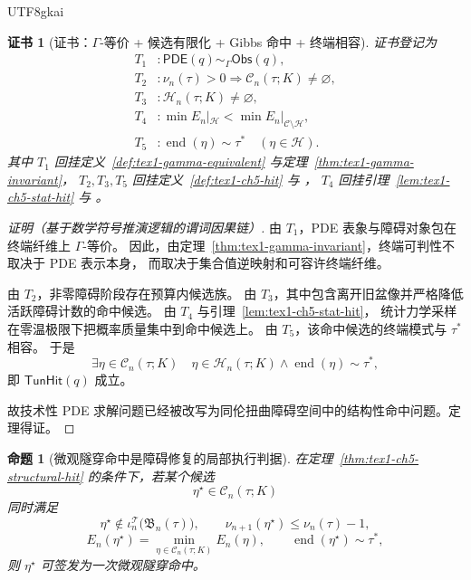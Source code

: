 \documentclass[12pt]{article}
\newtheorem{proposition}{命题}[section]
\newtheorem{Certificate}{证书}[section]
\begin{document}
\begin{CJK*}{UTF8}{gkai}
\begin{Certificate}[证书：\(\Gamma\)-等价 + 候选有限化 + Gibbs 命中 + 终端相容]
\label{cert:tex1-ch5-structural-hit}
证书登记为
\[
\begin{aligned}
  T_1 &: \mathsf{PDE}(q)\sim_\Gamma\mathsf{Obs}(q),\\
  T_2 &: \nu_n(\tau)>0\Rightarrow \mathcal C_n(\tau;K)\neq\varnothing,\\
  T_3 &: \mathcal H_n(\tau;K)\neq\varnothing,\\
  T_4 &: \min E_n|_{\mathcal H}<\min E_n|_{\mathcal C\setminus\mathcal H},\\
  T_5 &: \operatorname{end}(\eta)\sim\tau^\ast\quad(\eta\in\mathcal H).
\end{aligned}
\]
其中 \(T_1\) 回挂定义~\ref{def:tex1-gamma-equivalent} 与定理~\ref{thm:tex1-gamma-invariant}，
\(T_2,T_3,T_5\) 回挂定义~\ref{def:tex1-ch5-hit} 与 \cite{RepoTex38JacobiBianchiRepair,RepoTex39OpenRepairFamily}，
\(T_4\) 回挂引理~\ref{lem:tex1-ch5-stat-hit} 与 \cite{RepoTex53PDEStrategyCluster}。
\end{Certificate}

\begin{proof}[证明（基于数学符号推演逻辑的谓词因果链）]
由 \(T_1\)，PDE 表象与障碍对象包在终端纤维上 \(\Gamma\)-等价。
因此，由定理~\ref{thm:tex1-gamma-invariant}，终端可判性不取决于 PDE 表示本身，
而取决于集合值逆映射和可容许终端纤维。

由 \(T_2\)，非零障碍阶段存在预算内候选族。
由 \(T_3\)，其中包含离开旧盆像并严格降低活跃障碍计数的命中候选。
由 \(T_4\) 与引理~\ref{lem:tex1-ch5-stat-hit}，
统计力学采样在零温极限下把概率质量集中到命中候选上。
由 \(T_5\)，该命中候选的终端模式与 \(\tau^\ast\) 相容。
于是
\[
  \exists\eta\in\mathcal C_n(\tau;K)
  \quad
  \eta\in\mathcal H_n(\tau;K)
  \wedge
  \operatorname{end}(\eta)\sim\tau^\ast,
\]
即 \(\mathsf{TunHit}(q)\) 成立。

故技术性 PDE 求解问题已经被改写为同伦扭曲障碍空间中的结构性命中问题。定理得证。
\end{proof}

\begin{proposition}[微观隧穿命中是障碍修复的局部执行判据]
\label{prop:tex1-ch5-tunnel-hit-local}
在定理~\ref{thm:tex1-ch5-structural-hit} 的条件下，若某个候选
\[
  \eta^\star\in\mathcal C_n(\tau;K)
\]
同时满足
\[
  \eta^\star\notin\iota_n^{\mathcal T}\bigl(\mathfrak B_n(\tau)\bigr),
  \qquad
  \nu_{n+1}(\eta^\star)\le\nu_n(\tau)-1,
\]
\[
  E_n(\eta^\star)
  =
  \min_{\eta\in\mathcal C_n(\tau;K)}E_n(\eta),
  \qquad
  \operatorname{end}(\eta^\star)\sim\tau^\ast,
\]
则 \(\eta^\star\) 可签发为一次微观隧穿命中。
\end{proposition}


\end{CJK*}
\end{document}

